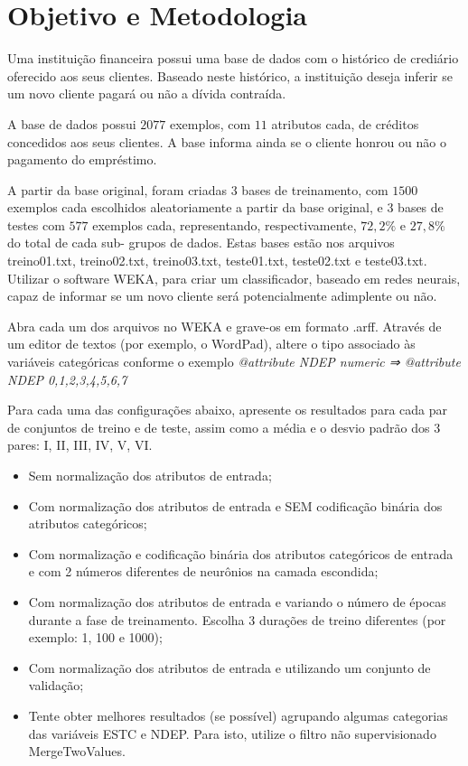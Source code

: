 \documentclass[journal, a4paper]{IEEEtran}
\begin{document}
\section{Objetivo e Metodologia}


Uma instituição financeira possui uma base de dados com o histórico de crediário
oferecido aos seus clientes. Baseado neste histórico, a instituição deseja inferir se um
novo cliente pagará ou não a dívida contraída.

A base de dados possui $2077$ exemplos, com $11$ atributos cada, de créditos concedidos
aos seus clientes. A base informa ainda se o cliente honrou ou não o pagamento do
empréstimo. 

A partir da base original, foram criadas 3 bases de treinamento, com $1500$ exemplos
cada escolhidos aleatoriamente a partir da base original, e $3$ bases de testes com $577$
exemplos cada, representando, respectivamente, $72,2\%$ e $27,8\%$ do total de cada sub-
grupos de dados. Estas bases estão nos arquivos treino01.txt, treino02.txt, treino03.txt,
teste01.txt, teste02.txt e teste03.txt. Utilizar o software WEKA, para criar um classificador, baseado em redes neurais, capaz de informar se um novo cliente será potencialmente adimplente ou não. 

Abra cada um dos arquivos no WEKA e grave-os em formato .arff. Através de um
editor de textos (por exemplo, o WordPad), altere o tipo associado às variáveis
categóricas conforme o exemplo \textit{@attribute NDEP numeric ⇒ @attribute NDEP {0,1,2,3,4,5,6,7}}

 Para cada uma das configurações abaixo, apresente os resultados para cada par de conjuntos de treino e de teste, assim como a média e o desvio padrão dos 3 pares: I, II, III, IV, V, VI.
\begin{itemize}
	 \item Sem normalização dos atributos de entrada;
     \item Com normalização dos atributos de entrada e SEM codificação binária dos atributos categóricos;
     \item Com normalização e codificação binária dos atributos categóricos de entrada e com 2 números diferentes de neurônios na camada escondida;
     \item Com normalização dos atributos de entrada e variando o número de épocas durante a fase de treinamento. Escolha 3 durações de treino diferentes (por exemplo: 1, 100 e 1000);
     \item Com normalização dos atributos de entrada e utilizando um conjunto de validação;
     \item Tente obter melhores resultados (se possível) agrupando algumas categorias das variáveis ESTC e NDEP. Para isto, utilize o filtro não supervisionado MergeTwoValues.
\end{itemize}
\end{document}
